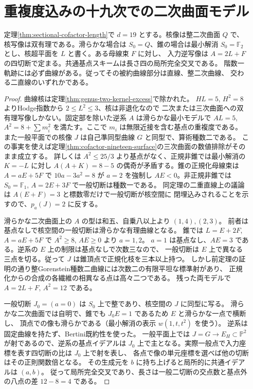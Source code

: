 \section{重複度込みの十九次での二次曲面モデル}
\label{sec:sectional-nineteen-model}
\begin{theorem}\label{thm:sectional-nineteen-model}
定理\ref{thm:sectional-cofactor-length}で $d=19$ とする。核像は整二次曲面 $Q$ で、
核写像は双有理である。滑らかな場合は $S_0=Q$、錐の場合は最小解消
$S_0=\mathbb F_2$ とし、核超平面を $L$ と書く。ある母線束 $F$ に対し、
入力逆写像は $A=2L+F$ の四切断で定まる。共通基点スキームは長さ四の局所完全交叉である。
階数一軌跡には必ず曲線がある。従ってその被約曲線部分は直線、整二次曲線、
交わる二直線のいずれかである。
\end{theorem}
\begin{proof}
曲線核は定理\ref{thm:genus-two-kernel-excess}で除かれた。
$HL=5$, $H^2=8$ よりHodge指数から $2\le L^2\le3$、核は非退化なので
二次または三次曲面への双有理写像しかない。固定部を除いた逆系 $A$ は滑らかな最小モデルで
$AL=5$, $A^2=8+\sum m_i^2$ を満たす。ここで $m_i$ は無限近接を含む基点の重複度である。
また一般平面での核像 $J$ は自己準同型曲線 $G$ と同型で、算術種数二である。
この事実を使えば定理\ref{thm:cofactor-nineteen-surface}の三次曲面の数値排除がそのまま成立する。
詳しくは $A^2\le25/3$ より基点がなく、正規非錐では最小解消の $K=-L$ に対し
$A(A+K)=8-5$ の偶奇が矛盾する。錐の正規化母線束は $A=aE+5F$ で
$10a-3a^2=8$ が $a=2$ を強制し $AE<0$。非正規非錐では
$S_0=\mathbb F_1$, $A=2E+3F$ で一般切断は種数一である。
同定理の二重直線上の議論は $A(E+F)=3$ と標数零だけで一般切断が核空間に
閉埋込みされることを示すので、$p_a(J)=2$ に反する。

滑らかな二次曲面上の $A$ の型は和五、自乗八以上より $(1,4),(2,3)$。
前者は基点なしで核空間の一般切断は滑らかな有理曲線となる。
錐では $L=E+2F$, $A=aE+5F$ で $A^2\ge8$, $AE\ge0$ より $a=1,2$。
$a=1$ は基点なし、$AE=3$ である。逆系の $E$ 上の制限は基点なしで次数三なので、
一般切断は $E$ 上で異なる三点を切る。従って $J$ は錐頂点で正規化枝を三本以上持つ。
しかし前定理の証明の通り整Gorenstein種数二曲線には次数二の有限平坦な標準射があり、
正規化からの合成の各繊維の相異なる点は高々二つである。
残った両モデルで $A=2L+F$, $A^2=12$ である。

一般切断 $J_0=(a=0)$ は $S_0$ 上で整であり、核空間の $J$ に同型に写る。
滑らかな二次曲面では自明で、錐でも $J_0 E=1$ であるため $E$ と滑らかな一点で横断し、
頂点での像も滑らかである（最小解消の表示 $w(1,t,t^2)$ を使う）。
逆系は固定曲線を持たず、Bertini既約性を使った。
一般平面上では $J=G\to E_H\subset\mathbb P^2$ が射であるので、逆系の基点イデアルは
$J_0$ 上で主となる。実際一般点で入力座標を表す四切断の比は $J_0$ 上で射を表し、
各点で像の単元座標を選べば他の切断はその正則関数倍となる。
その生成元を $b$ に持ち上げると局所的に共通イデアルは $(a,b)$。
従って局所完全交叉であり、長さは一般二切断の交点数と基点外の八点の差 $12-8=4$ である。


\end{proof}
